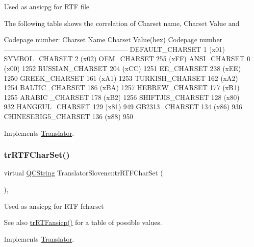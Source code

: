 Used as ansicpg for R\+TF file

The following table shows the correlation of Charset name, Charset Value and 
\begin{DoxyPre}
Codepage number:
Charset Name       Charset Value(hex)  Codepage number
------------------------------------------------------
DEFAULT\_CHARSET           1 (x01)
SYMBOL\_CHARSET            2 (x02)
OEM\_CHARSET             255 (xFF)
ANSI\_CHARSET              0 (x00)            1252
RUSSIAN\_CHARSET         204 (xCC)            1251
EE\_CHARSET              238 (xEE)            1250
GREEK\_CHARSET           161 (xA1)            1253
TURKISH\_CHARSET         162 (xA2)            1254
BALTIC\_CHARSET          186 (xBA)            1257
HEBREW\_CHARSET          177 (xB1)            1255
ARABIC \_CHARSET         178 (xB2)            1256
SHIFTJIS\_CHARSET        128 (x80)             932
HANGEUL\_CHARSET         129 (x81)             949
GB2313\_CHARSET          134 (x86)             936
CHINESEBIG5\_CHARSET     136 (x88)             950
\end{DoxyPre}
 

Implements \mbox{\hyperlink{class_translator_a9953a4c0e6a4fc7d017abcd5c2939e0f}{Translator}}.

\mbox{\label{class_translator_slovene_a3cb28c1244be75e56b524294bf30a5a6}} 
\subsubsection{\texorpdfstring{trRTFCharSet()}{trRTFCharSet()}}
{\footnotesize\ttfamily virtual \mbox{\hyperlink{class_q_c_string}{Q\+C\+String}} Translator\+Slovene\+::tr\+R\+T\+F\+Char\+Set (\begin{DoxyParamCaption}{ }\end{DoxyParamCaption})\hspace{0.3cm}{\ttfamily [inline]}, {\ttfamily [virtual]}}

Used as ansicpg for R\+TF fcharset \begin{DoxySeeAlso}{See also}
\mbox{\hyperlink{class_translator_slovene_a381c8c7ad7fe0ea5379e1ed062ba0905}{tr\+R\+T\+Fansicp()}} for a table of possible values. 
\end{DoxySeeAlso}


Implements \mbox{\hyperlink{class_translator_afad391f3cbfb5ce6332b7239f8e2049a}{Translator}}.


